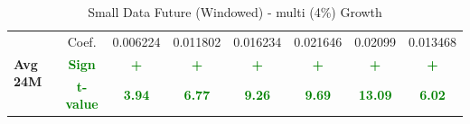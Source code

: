 \documentclass[11pt,english,a4paper,hidelinks]{book}
\begin{document}
\begin{table}[H]
\begin{tabular}{lccccccc}
        \multirow{3}{*}{\textbf{Avg 24M}}
            & Coef.   & 0.006224  & 0.011802  & 0.016234  & 0.021646  & 0.02099   & 0.013468  \\
            & \textbf{\textcolor{green}{Sign}}
                     & \textbf{\textcolor{green}{+}}
                     & \textbf{\textcolor{green}{+}}
                     & \textbf{\textcolor{green}{+}}
                     & \textbf{\textcolor{green}{+}}
                     & \textbf{\textcolor{green}{+}}
                     & \textbf{\textcolor{green}{+}} \\
            & \textbf{\textcolor{green}{t-value}}
                     & \textbf{\textcolor{green}{3.94}}
                     & \textbf{\textcolor{green}{6.77}}
                     & \textbf{\textcolor{green}{9.26}}
                     & \textbf{\textcolor{green}{9.69}}
                     & \textbf{\textcolor{green}{13.09}}
                     & \textbf{\textcolor{green}{6.02}} \\
        \bottomrule
    \end{tabular}
    \caption{Small Data Future (Windowed) - \acrshort{multi} (4\%) Growth}
    \label{tab:growth_windowed_reformat}
\end{table}
\end{document}
